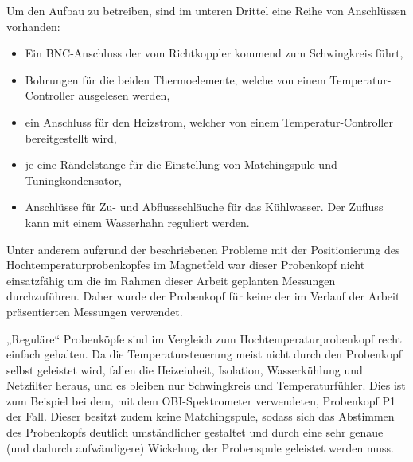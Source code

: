 Um den Aufbau zu betreiben, sind im unteren Drittel eine Reihe von Anschlüssen vorhanden:
\begin{itemize}
	\item Ein BNC-Anschluss der vom Richtkoppler kommend zum Schwingkreis führt,
	\item Bohrungen für die beiden Thermoelemente, welche von einem Temperatur-Controller ausgelesen werden,
	\item ein Anschluss für den Heizstrom, welcher von einem Temperatur-Controller bereitgestellt wird,
	\item je eine Rändelstange für die Einstellung von Matching\-spu\-le und Tuningkondensator,
	\item Anschlüsse für Zu- und Abflussschläuche für das Kühlwasser. Der Zufluss kann mit einem Wasserhahn reguliert werden.
\end{itemize}

Unter anderem aufgrund der beschriebenen Probleme mit der Positionierung des Hochtemperaturprobenkopfes im Magnetfeld war dieser Probenkopf nicht einsatzfähig um die im Rahmen dieser Arbeit geplanten Messungen durchzuführen. Daher wurde der Probenkopf für keine der im Verlauf der Arbeit präsentierten Messungen verwendet.

„Reguläre“ Probenköpfe sind im Vergleich zum Hochtemperaturprobenkopf recht einfach gehalten. Da die Temperatursteuerung meist nicht durch den Probenkopf selbst geleistet wird, fallen die Heizeinheit, Isolation, Wasserkühlung und Netzfilter heraus, und es bleiben nur Schwingkreis und Temperaturfühler. Dies ist zum Beispiel bei dem, mit dem OBI-Spektrometer verwendeten, Probenkopf P1 der Fall. Dieser besitzt zudem keine Match\-ing\-spu\-le, sodass sich das Abstimmen des Probenkopfs deutlich umständlicher gestaltet und durch eine sehr genaue (und dadurch aufwändigere) Wickelung der Probenspule geleistet werden muss.

